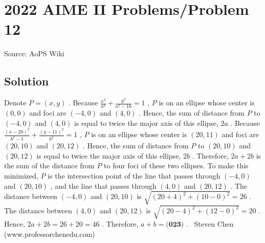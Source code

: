 \documentclass[12pt]{article}
\begin{document}
\section*{{2022 AIME II Problems/Problem 12}}
Source: AoPS Wiki

\subsection*{Solution}
Denote $P = \left( x , y \right)$ . Because $\frac{x^2}{a^2}+\frac{y^2}{a^2-16} = 1$ , $P$ is on an ellipse whose center is $\left( 0 , 0 \right)$ and foci are $\left( - 4 , 0 \right)$ and $\left( 4 , 0 \right)$ . Hence, the sum of distance from $P$ to $\left( - 4 , 0 \right)$ and $\left( 4 , 0 \right)$ is equal to twice the major axis of this ellipse, $2a$ . Because $\frac{(x-20)^2}{b^2-1}+\frac{(y-11)^2}{b^2} = 1$ , $P$ is on an ellipse whose center is $\left( 20 , 11 \right)$ and foci are $\left( 20 , 10 \right)$ and $\left( 20 , 12 \right)$ . Hence, the sum of distance from $P$ to $\left( 20 , 10 \right)$ and $\left( 20 , 12 \right)$ is equal to twice the major axis of this ellipse, $2b$ . Therefore, $2a + 2b$ is the sum of the distance from $P$ to four foci of these two ellipses. To make this minimized, $P$ is the intersection point of the line that passes through $\left( - 4 , 0 \right)$ and $\left( 20 , 10 \right)$ , and the line that passes through $\left( 4 , 0 \right)$ and $\left( 20 , 12 \right)$ . The distance between $\left( - 4 , 0 \right)$ and $\left( 20 , 10 \right)$ is $\sqrt{\left( 20 + 4 \right)^2 + \left( 10 - 0 \right)^2} = 26$ . The distance between $\left( 4 , 0 \right)$ and $\left( 20 , 12 \right)$ is $\sqrt{\left( 20 - 4 \right)^2 + \left( 12 - 0 \right)^2} = 20$ . Hence, $2 a + 2 b = 26 + 20 = 46$ . Therefore, $a + b = \boxed{\textbf{(023) }}.$ ~Steven Chen (www.professorchenedu.com)
\end{document}
